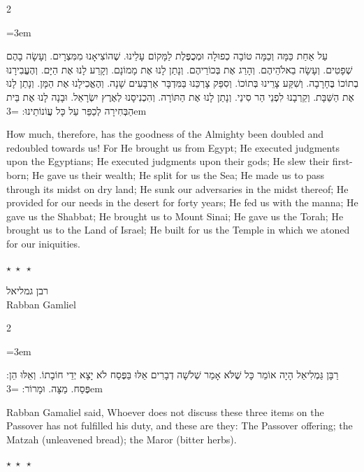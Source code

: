 \documentclass[11pt, openany]{book}
\newcommand{\sederdivider}{%
  \par\vspace{6pt}
  \begin{center}
    \textcolor{sedergold}{\large$\star\;\star\;\star$}
  \end{center}
  \par\vspace{6pt}
}
\newenvironment{bilingual}{%
  \par\vspace{4pt}%
  \begin{paracol}{2}%
}{%
  \end{paracol}%
  \par\vspace{2pt}%
}
\newenvironment{hebrewcol}{%
  \switchcolumn[1]%
  \begingroup
  \RTL
  \hebrewfont\large
  \setstretch{1.4}%
  \emergencystretch=3em
  \tolerance=9999
  \parindent=0pt\relax
}{%
  \endRTL
  \endgroup
}
\newenvironment{englishcol}{%
  \switchcolumn[0]%
  \begingroup
  \setstretch{1.4}%
  \emergencystretch=3em
  \tolerance=9999
  \normalsize
  \rightskip=0.12in\relax
}{%
  \endgroup
}
\newcommand{\parasep}{%
  \par\vspace{3pt}
  \begin{center}
    \textcolor{sedergold!50}{\small$\star\;\star\;\star$}
  \end{center}
  \par\vspace{3pt}
}
\newcommand{\subsedertitle}[2]{%
  \par\vspace{8pt}
  \begin{center}
    {\kidssteptitlefonthebrew\textcolor{sederblue}{\beginR #1\endR}}\\[3pt]
    {\kidssteptitlefont\normalsize\textcolor{sederblue}{#2}}
  \end{center}
  \par\vspace{3pt}
}
\begin{document}
\begin{bilingual}
\begin{hebrewcol}
עַל אַחַת כַּמָּה וְכַמָּה טוֹבָה כְפוּלָה וּמְכֻפֶּלֶת לַמָּקוֹם עָלֵינוּ. שֶׁהוֹצִיאָנוּ מִמִּצְרָיִם. וְעָשָׂה בָהֶם שְׁפָטִים. וְעָשָׂה בֵאלֹהֵיהֶם. וְהָרַג אֶת בְּכוֹרֵיהֶם. וְנָתַן לָנוּ אֶת מָמוֹנָם. וְקָרַע לָנוּ אֶת הַיָּם. וְהֶעֱבִירָנוּ בְתוֹכוֹ בֶּחָרָבָה. וְשִׁקַּע צָרֵינוּ בְּתוֹכוֹ. וְסִפֵּק צָרְכֵּנוּ בַּמִּדְבָּר אַרְבָּעִים שָׁנָה. וְהֶאֱכִילָנוּ אֶת הַמָּן. וְנָתַן לָנוּ אֶת הַשַּׁבָּת. וְקֵרְבָנוּ לִפְנֵי הַר סִינַי. וְנָתַן לָנוּ אֶת הַתּוֹרָה. וְהִכְנִיסָנוּ לְאֶרֶץ יִשְׂרָאֵל. וּבָנָה לָנוּ אֶת בֵּית הַבְּחִירָה לְכַפֵּר עַל כָּל עֲוֹנוֹתֵינוּ:
\end{hebrewcol}
\begin{englishcol}
How much, therefore, has the goodness of the Almighty been doubled and redoubled towards us! For He brought us from Egypt; He executed judgments upon the Egyptians; He executed judgments upon their gods; He slew their first-born; He gave us their wealth; He split for us the Sea; He made us to pass through its midst on dry land; He sunk our adversaries in the midst thereof; He provided for our needs in the desert for forty years; He fed us with the manna; He gave us the Shabbat; He brought us to Mount Sinai; He gave us the Torah; He brought us to the Land of Israel; He built for us the Temple in which we atoned for our iniquities.
\end{englishcol}
\end{bilingual}
\sederdivider

\subsedertitle{רבן גמליאל}{Rabban Gamliel}

\begin{bilingual}
\begin{hebrewcol}
רַבָּן גַּמְלִיאֵל הָיָה אוֹמֵר כָּל שֶׁלֹּא אָמַר שְׁלֹשָׁה דְבָרִים אֵלּוּ בַּפֶּסַח לֹא יָצָא יְדֵי חוֹבָתוֹ. וְאֵלּוּ הֵן: פֶּסַח. מַצָּה. וּמָרוֹר:
\end{hebrewcol}
\begin{englishcol}
Rabban Gamaliel said, Whoever does not discuss these three items on the Passover has not fulfilled his duty, and these are they: The Passover offering; the Matzah (unleavened bread); the Maror (bitter herbs).
\end{englishcol}
\end{bilingual}
\parasep
\end{document}
